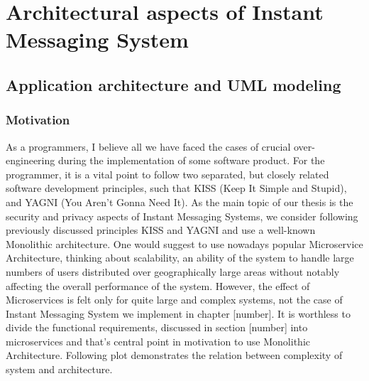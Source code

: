 \chapter{Architectural aspects of Instant Messaging System}\label{ch:secure-ims-implementation}


\section{Application architecture and UML modeling}\label{sec:application-architecture-and-uml-modeling}

\subsection{Motivation}\label{subsec:motivation}
As a programmers, I believe all we have faced the cases of crucial over-engineering during the implementation of some software product.
For the programmer, it is a vital point to follow two separated, but closely related software development principles, such that
KISS (Keep It Simple and Stupid), and YAGNI (You Aren't Gonna Need It).
As the main topic of our thesis is the security and privacy aspects of Instant Messaging Systems, we consider following
previously discussed principles KISS and YAGNI and use a well-known Monolithic architecture.
One would suggest to use nowadays popular Microservice Architecture, thinking about scalability,
an ability of the system to handle large numbers of users distributed over geographically large areas without notably affecting
the overall performance of the system.
However, the effect of Microservices is felt only for quite large and complex systems, not the case of Instant Messaging System
we implement in chapter [number].
It is worthless to divide the functional requirements, discussed in section [number] into microservices and that's central point
in motivation to use Monolithic Architecture.
Following plot demonstrates the relation between complexity of system and architecture.

